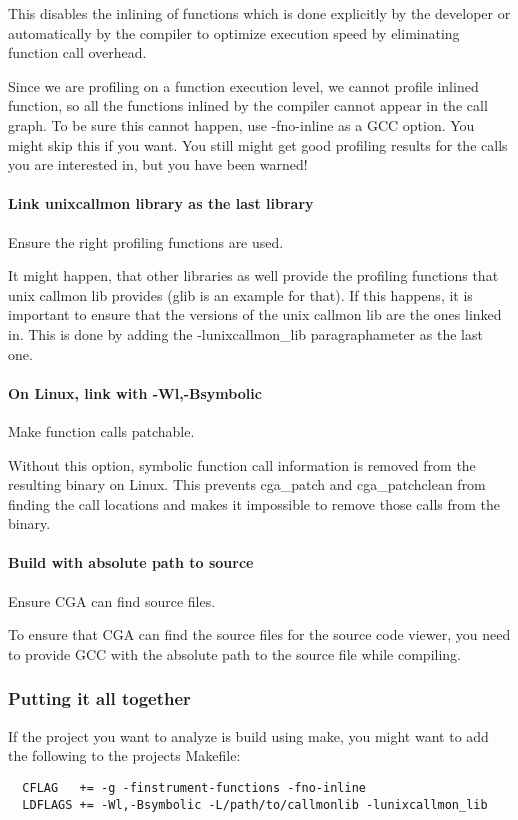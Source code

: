 This disables the inlining of functions which is done explicitly by the developer or automatically by the compiler to optimize execution speed by eliminating function call overhead.

Since we are profiling on a function execution level, we cannot profile inlined function, so all the functions inlined by the compiler cannot appear in the call graph. To be sure this cannot happen, use -fno-inline as a GCC option. You might skip this if you want. You still might get good profiling results for the calls you are interested in, but you have been warned!

\paragraph{Link unixcallmon library as the last library} Ensure the right profiling functions are used.

It might happen, that other libraries as well provide the profiling functions that unix callmon lib provides (glib is an example for that). If this happens, it is important to ensure that the versions of the unix callmon lib are the ones linked in. This is done by adding the -lunixcallmon\_lib paragraphameter as the last one.

\paragraph{On Linux, link with -Wl,-Bsymbolic} Make function calls patchable.


Without this option, symbolic function call information is removed from the resulting binary on Linux. This prevents cga\_patch and cga\_patchclean from finding the call locations and makes it impossible to remove those calls from the binary. 

\paragraph{Build with absolute path to source} Ensure CGA can find source files.

To ensure that CGA can find the source files for the source code viewer, you need to provide GCC with the absolute path to the source file while compiling.

\subsubsection{Putting it all together} If the project you want to analyze is build using make, you might want to add the following to the projects Makefile:
\begin{verbatim}
  CFLAG   += -g -finstrument-functions -fno-inline 
  LDFLAGS += -Wl,-Bsymbolic -L/path/to/callmonlib -lunixcallmon_lib
\end{verbatim}

